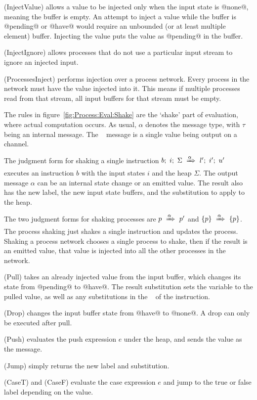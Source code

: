 (InjectValue) allows a value to be injected only when the input state is @none@, meaning the buffer is empty.
An attempt to inject a value while the buffer is @pending@ or @have@ would require an unbounded (or at least multiple element) buffer.
Injecting the value puts the value as @pending@ in the buffer.

(InjectIgnore) allows processes that do not use a particular input stream to ignore an injected input.

(ProcessesInject) performs injection over a process network.
Every process in the network must have the value injected into it.
This means if multiple processes read from that stream, all input buffers for that stream must be empty.

The rules in figure~\ref{fig:Process:Eval:Shake} are the `shake' part of evaluation, where actual computation occurs. 
As usual, $\alpha$ denotes the message type, with $\tau$ being an internal message. The \Push~ message is a single value being output on a channel.


The judgment form for shaking a single instruction $b;~i;~\Sigma~\xRightarrow{\alpha}~l';~i';~u'$
executes an instruction $b$ with the input states $i$ and the heap $\Sigma$.
The output message $\alpha$ can be an internal state change or an emitted value.
The result also has the new label, the new input state buffers, and the substitution to apply to the heap.

The two judgment forms for shaking processes are $p~\xRightarrow{\alpha}~p'$ and $\{ p \}~\xRightarrow{\alpha}~\{ p \}$.
The process shaking just shakes a single instruction and updates the process.
Shaking a process network chooses a single process to shake, then if the result is an emitted value, that value is injected into all the other processes in the network.

(Pull) takes an already injected value from the input buffer, which changes its state from @pending@ to @have@.
The result substitution sets the variable to the pulled value, as well as any substitutions in the \Next~ of the instruction.

(Drop) changes the input buffer state from @have@ to @none@. A drop can only be executed after pull.

(Push) evaluates the push expression $e$ under the heap, and sends the value as the message.

(Jump) simply returns the new label and substitution.

(CaseT) and (CaseF) evaluate the case expression $e$ and jump to the true or false label depending on the value.

